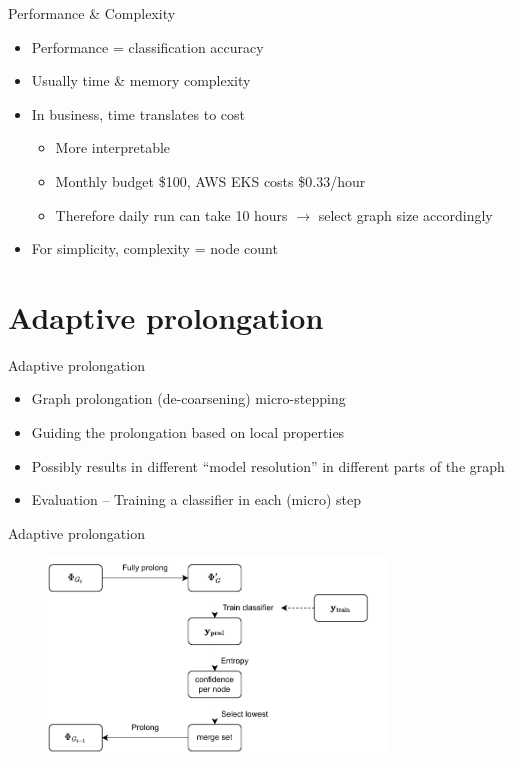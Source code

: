 \documentclass[10pt, aspectratio=169]{beamer}
\begin{document}
\begin{frame}{Performance \& Complexity}
	\begin{itemize}
		\item Performance = classification accuracy
	    \item Usually time \& memory complexity
        \item In business, time translates to cost
        \begin{itemize}
            \item More interpretable
            \item Monthly budget \$100, AWS EKS costs \$0.33/hour
            \item Therefore daily run can take 10 hours $\to$ select graph size accordingly
        \end{itemize}
		\item For simplicity, complexity = node count
    \end{itemize}
\end{frame}

\section{Adaptive prolongation}

\begin{frame}{Adaptive prolongation}
	\begin{itemize}
		\item Graph prolongation (de-coarsening) micro-stepping
		\item Guiding the prolongation based on local properties
		\item Possibly results in different \enquote{model resolution} in different parts of the graph
		\item Evaluation -- Training a classifier in each (micro) step
	\end{itemize}
\end{frame}

\begin{frame}{Adaptive prolongation}
	\begin{figure}
		\centering
		\includegraphics[width=0.8\textwidth]{images/adaptive-prolongation/adaptive-prolongation.pdf}
	\end{figure}
\end{frame}
\end{document}
